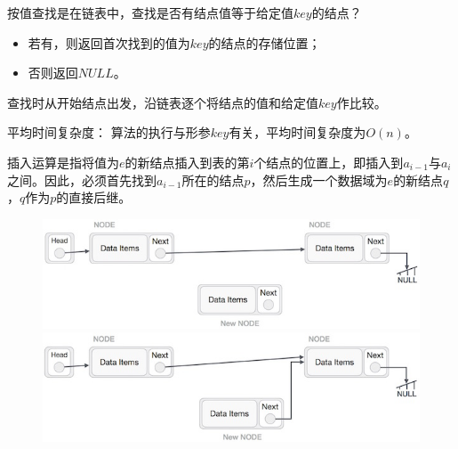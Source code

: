 \begin{frame}

按值查找是在链表中，查找是否有结点值等于给定值$key$的结点？
\begin{itemize}
\item
若有，则返回首次找到的值为$key$的结点的存储位置；
\item
否则返回$NULL$。
\end{itemize}
查找时从开始结点出发，沿链表逐个将结点的值和给定值$key$作比较。

\end{frame}

\begin{frame}[fragile]


\end{frame}

\begin{frame}[fragile]

\textcolor{acolor5}{平均时间复杂度：}
算法的执行与形参$key$有关，平均时间复杂度为$O(n)$。

\end{frame}

\begin{frame}

插入运算是指将值为$e$的新结点插入到表的第$i$个结点的位置上，即插入到$a_{i-1}$与$a_i$之间。因此，必须首先找到$a_{i-1}$所在的结点$p$，然后生成一个数据域为$e$的新结点$q$，$q$作为$p$的直接后继。
\end{frame}

\begin{frame}
\begin{figure}
\centering
\includegraphics[width=4.5in]{Chapters/Ch02/Fig/linked_list_insertion_0.jpg}\\[0.1cm]\pause 
\includegraphics[width=4.5in]{Chapters/Ch02/Fig/linked_list_insertion_1.jpg}
\end{figure}
\end{frame}

